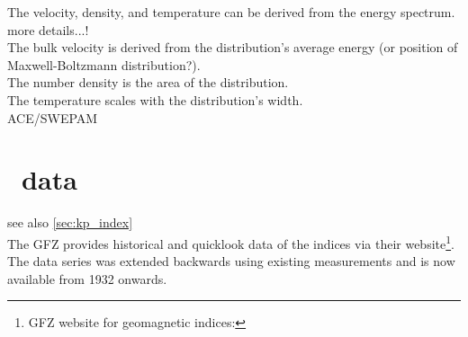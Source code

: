 The velocity, density, and temperature can be derived from the energy spectrum.\\
more details...!\\

The bulk velocity is derived from the distribution's average energy (or position of Maxwell-Boltzmann distribution?).\\
The number density is the area of the distribution.\\
The temperature scales with the distribution's width.\\


ACE/SWEPAM\\	%


\section{\Kp{}~data}
\label{sec:kp_data}

see also \ref{sec:kp_index}\\

The GFZ provides historical and quicklook data of the indices via their website\footnote{GFZ website for geomagnetic indices: }.\\

The data series was extended backwards using existing measurements and is now available from 1932 onwards.\\

